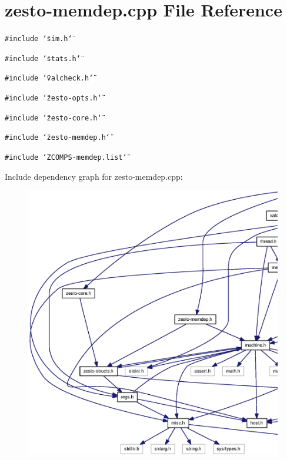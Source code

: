 \section{zesto-memdep.cpp File Reference}
\label{zesto-memdep_8cpp}
{\tt \#include \char`\"{}sim.h\char`\"{}}\par
{\tt \#include \char`\"{}stats.h\char`\"{}}\par
{\tt \#include \char`\"{}valcheck.h\char`\"{}}\par
{\tt \#include \char`\"{}zesto-opts.h\char`\"{}}\par
{\tt \#include \char`\"{}zesto-core.h\char`\"{}}\par
{\tt \#include \char`\"{}zesto-memdep.h\char`\"{}}\par
{\tt \#include \char`\"{}ZCOMPS-memdep.list\char`\"{}}\par


Include dependency graph for zesto-memdep.cpp:\nopagebreak
\begin{figure}[H]
\begin{center}
\leavevmode
\includegraphics[width=420pt]{zesto-memdep_8cpp__incl}
\end{center}
\end{figure}
